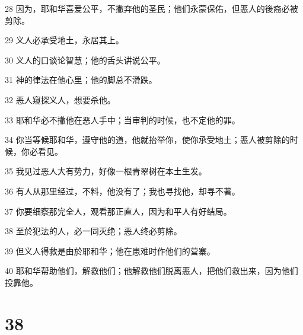 \par 28 因为，耶和华喜爱公平，不撇弃他的圣民；他们永蒙保佑，但恶人的後裔必被剪除。
\par 29 义人必承受地土，永居其上。
\par 30 义人的口谈论智慧；他的舌头讲说公平。
\par 31 神的律法在他心里；他的脚总不滑跌。
\par 32 恶人窥探义人，想要杀他。
\par 33 耶和华必不撇他在恶人手中；当审判的时候，也不定他的罪。
\par 34 你当等候耶和华，遵守他的道，他就抬举你，使你承受地土；恶人被剪除的时候，你必看见。
\par 35 我见过恶人大有势力，好像一根青翠树在本土生发。
\par 36 有人从那里经过，不料，他没有了；我也寻找他，却寻不著。
\par 37 你要细察那完全人，观看那正直人，因为和平人有好结局。
\par 38 至於犯法的人，必一同灭绝；恶人终必剪除。
\par 39 但义人得救是由於耶和华；他在患难时作他们的营寨。
\par 40 耶和华帮助他们，解救他们；他解救他们脱离恶人，把他们救出来，因为他们投靠他。

\chapter{38}


